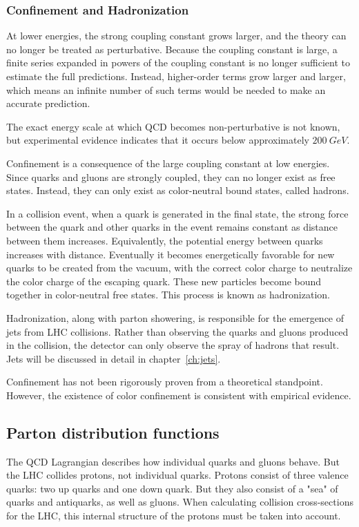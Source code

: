 \subsubsection{Confinement and Hadronization}

At lower energies, the strong coupling constant grows larger, and the theory can no longer be treated as perturbative.
Because the coupling constant is large,
a finite series expanded in powers of the coupling constant is no longer sufficient to estimate the full predictions.
Instead, higher-order terms grow larger and larger, which means an infinite number of such terms would be needed to make an accurate prediction.

The exact energy scale at which QCD becomes non-perturbative is not known,
but experimental evidence indicates that it occurs below approximately $200~GeV$.

Confinement is a consequence of the large coupling constant at low energies.
Since quarks and gluons are strongly coupled, they can no longer exist as free states.
Instead, they can only exist as color-neutral bound states, called hadrons.

In a collision event, when a quark is generated in the final state,
the strong force between the quark and other quarks in the event remains constant as distance between them increases.
Equivalently, the potential energy between quarks increases with distance.
Eventually it becomes energetically favorable for new quarks to be created from the vacuum,
with the correct color charge to neutralize the color charge of the escaping quark.
These new particles become bound together in color-neutral free states.
This process is known as hadronization.

Hadronization, along with parton showering, is responsible for the emergence of jets from LHC collisions.
Rather than observing the quarks and gluons produced in the collision,
the detector can only observe the spray of hadrons that result.
Jets will be discussed in detail in chapter~\ref{ch:jets}.

Confinement has not been rigorously proven from a theoretical standpoint.
However, the existence of color confinement is consistent with empirical evidence.

\subsection{Parton distribution functions}\label{subsec:qcd_pdfs}

The QCD Lagrangian describes how individual quarks and gluons behave.
But the LHC collides protons, not individual quarks.
Protons consist of three valence quarks: two up quarks and one down quark.
But they also consist of a "sea" of quarks and antiquarks, as well as gluons.
When calculating collision cross-sections for the LHC, this internal structure of the protons must be taken into account.

